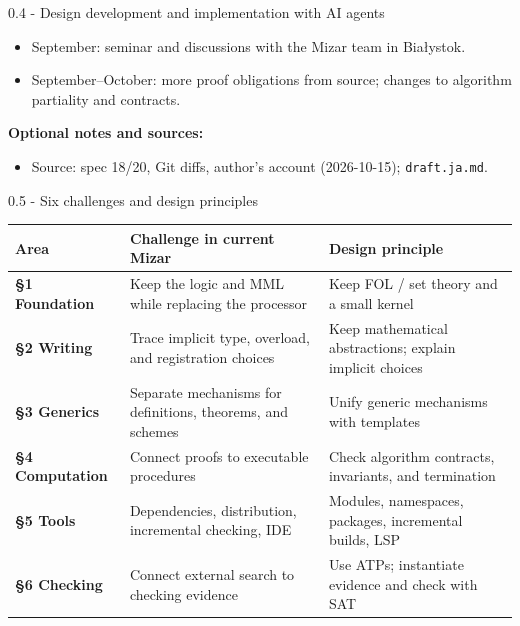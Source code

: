 \documentclass[aspectratio=169,11pt]{beamer}
\begin{document}
\begin{frame}[fragile,t]{0.4 - Design development and implementation with AI agents}
{\begin{itemize}
\item September: seminar and discussions with the Mizar team in Bia\l{}ystok.
\item September–October: more proof obligations from source; changes to algorithm partiality and contracts.
\end{itemize}
\smallskip
\textbf{Optional notes and sources:}
\begin{itemize}
\setlength{\itemsep}{1pt}
\setlength{\parsep}{0pt}
\setlength{\parskip}{0pt}
\item Source: spec 18/20, Git diffs, author's account (2026-10-15); \texttt{draft.ja.md}.
\end{itemize}
}
\end{frame}

\begin{frame}[fragile,t]{0.5 - Six challenges and design principles}
\par{}
\begin{small}
\setlength{\tabcolsep}{3pt}
\renewcommand{\arraystretch}{1.35}
\begin{tabularx}{\textwidth}{l>{\raggedright\arraybackslash}X>{\raggedright\arraybackslash}X}
\toprule
\textbf{Area} & \textbf{Challenge in current Mizar} & \textbf{Design principle} \\
\midrule
\textcolor{blue!55!black}{\textbf{§1 Foundation}} & Keep the logic and MML while replacing the processor & Keep FOL / set theory and a small kernel \\
\textcolor{blue!55!black}{\textbf{§2 Writing}} & Trace implicit type, overload, and registration choices & Keep mathematical abstractions; explain implicit choices \\
\textcolor{blue!55!black}{\textbf{§3 Generics}} & Separate mechanisms for definitions, theorems, and schemes & Unify generic mechanisms with templates \\
\textcolor{blue!55!black}{\textbf{§4 Computation}} & Connect proofs to executable procedures & Check algorithm contracts, invariants, and termination \\
\textcolor{blue!55!black}{\textbf{§5 Tools}} & Dependencies, distribution, incremental checking, IDE & Modules, namespaces, packages, incremental builds, LSP \\
\textcolor{blue!55!black}{\textbf{§6 Checking}} & Connect external search to checking evidence & Use ATPs; instantiate evidence and check with SAT \\
\bottomrule
\end{tabularx}
\end{small}


\end{frame}
\end{document}
